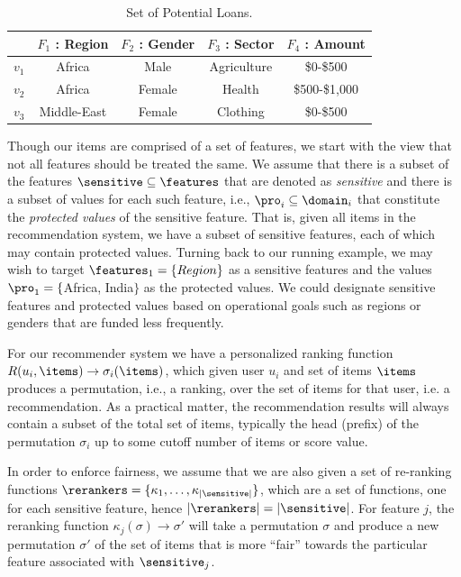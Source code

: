 \begin{table}
    \begin{tabular}{|c|c|c|c|c|}
    \hline
            & $F_{1}$ : Region & $F_{2}$ : Gender & $F_{3}$ : Sector & $F_{4}$ : Amount \\
    \hline
        $v_1$ & Africa & Male & Agriculture & \$0-\$500\\
    \hline
        $v_2$ & Africa & Female & Health & \$500-\$1,000\\
    \hline
        $v_3$ & Middle-East & Female & Clothing & \$0-\$500 \\
    \hline
    \end{tabular}
    \caption{Set of Potential Loans.}
    \label{table:user_profile}
\end{table}


Though our items are comprised of a set of features, we start with the view that not all features should be treated the same. We assume that there is a subset of the features $\sensitive \subseteq \features$ that are denoted as \textit{sensitive} and there is a subset of values for each such feature, i.e., $\pro_i \subseteq \domain_i$ that constitute the \emph{protected values} of the sensitive feature. That is, given all items in the recommendation system, we have a subset of sensitive features, each of which may contain protected values. Turning back to our running example, we may wish to target $\features_1=\{Region\}$ as a sensitive features and the values $\pro_1=\{$Africa, India$\}$ as the protected values. We could designate sensitive features and protected values based on operational goals such as regions or genders that are funded less frequently.

For our recommender system we have a personalized ranking function $R(u_i, \items) \rightarrow \sigma_i(\items)$, which given user $u_i$ and set of items $\items$ produces a permutation, i.e., a ranking, over the set of items for that user, i.e. a recommendation. As a practical matter, the recommendation results will always contain a subset of the total set of items, typically the head (prefix) of the permutation $\sigma_i$ up to some cutoff number of items or score value.

In order to enforce fairness, we assume that we are also given a set of re-ranking functions $\rerankers = \{\kappa_1, \ldots, \kappa_{|\sensitive|}\}$, which are a set of functions, one for each sensitive feature, hence $|\rerankers| = |\sensitive|$.  For feature $j$, the reranking function $\kappa_j(\sigma) \rightarrow \sigma'$ will take a permutation $\sigma$ and produce a new permutation $\sigma'$ of the set of items that is more ``fair'' towards the particular feature associated with $\sensitive_j$. 

